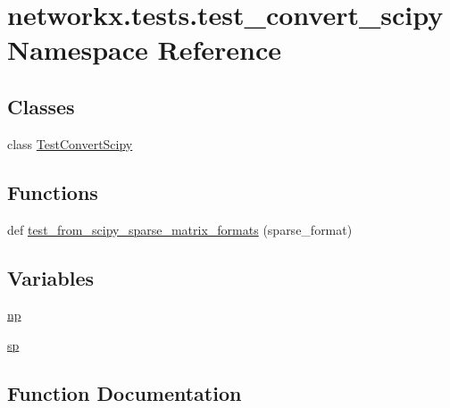 \hypertarget{namespacenetworkx_1_1tests_1_1test__convert__scipy}{}\section{networkx.\+tests.\+test\+\_\+convert\+\_\+scipy Namespace Reference}
\label{namespacenetworkx_1_1tests_1_1test__convert__scipy}
\subsection*{Classes}
\begin{DoxyCompactItemize}
\item 
class \hyperlink{classnetworkx_1_1tests_1_1test__convert__scipy_1_1TestConvertScipy}{Test\+Convert\+Scipy}
\end{DoxyCompactItemize}
\subsection*{Functions}
\begin{DoxyCompactItemize}
\item 
def \hyperlink{namespacenetworkx_1_1tests_1_1test__convert__scipy_a7b59405ff43f782cc38fc1689dc8ff56}{test\+\_\+from\+\_\+scipy\+\_\+sparse\+\_\+matrix\+\_\+formats} (sparse\+\_\+format)
\end{DoxyCompactItemize}
\subsection*{Variables}
\begin{DoxyCompactItemize}
\item 
\hyperlink{namespacenetworkx_1_1tests_1_1test__convert__scipy_ad212cfae990c3408de8a60bdb09a0e2d}{np}
\item 
\hyperlink{namespacenetworkx_1_1tests_1_1test__convert__scipy_a8f609e0c5acf4b52c23d42a6c4d1014d}{sp}
\end{DoxyCompactItemize}


\subsection{Function Documentation}
\mbox{\label{namespacenetworkx_1_1tests_1_1test__convert__scipy_a7b59405ff43f782cc38fc1689dc8ff56}} 
